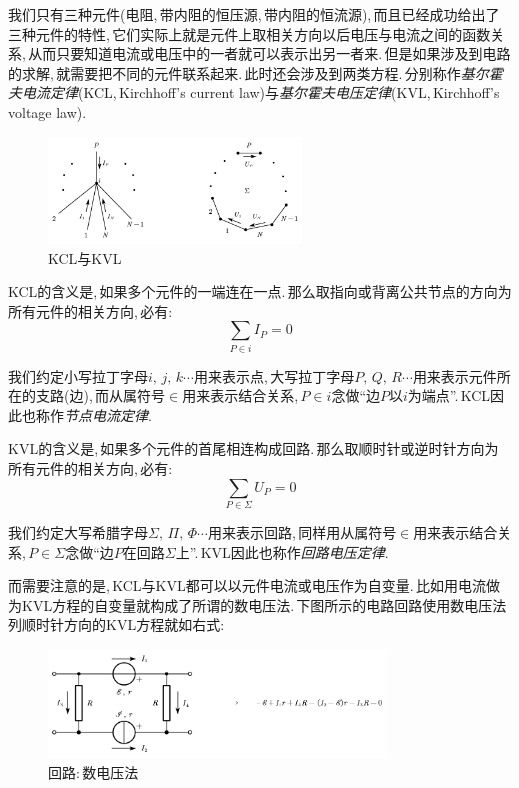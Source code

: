 \vspace{1cm}

我们只有三种元件(电阻,\,带内阻的恒压源,\,带内阻的恒流源),\,而且已经成功给出了三种元件的特性,\,它们实际上就是元件上取相关方向以后电压与电流之间的函数关系,\,从而只要知道电流或电压中的一者就可以表示出另一者来.\,但是如果涉及到电路的求解,\,就需要把不同的元件联系起来.\,此时还会涉及到两类方程.\,分别称作\emph{基尔霍夫电流定律}(KCL,\,Kirchhoff's current law)与\emph{基尔霍夫电压定律}(KVL,\,Kirchhoff's voltage law).

\begin{figure}[H]
\centering
\includegraphics[width=0.6\textwidth]{image/7-3-11.png}
\caption{KCL与KVL}
\end{figure}

KCL的含义是,\,如果多个元件的一端连在一点.\,那么取指向或背离公共节点的方向为所有元件的相关方向,\,必有:
\[\sum_{P\in i} I_P=0\]

我们约定小写拉丁字母$i,\,j,\,k\cdots$用来表示点,\,大写拉丁字母$P,\,Q,\,R\cdots$用来表示元件所在的支路(边),\,而从属符号$\in$用来表示结合关系,\,$P\in i$念做``边$P$以$i$为端点''.\,KCL因此也称作\emph{节点电流定律}.

KVL的含义是,\,如果多个元件的首尾相连构成回路.\,那么取顺时针或逆时针方向为所有元件的相关方向,\,必有:
\[\sum_{P\in \Sigma} U_P=0\]

我们约定大写希腊字母$\Sigma ,\,\Pi,\, \Phi\cdots$用来表示回路,\,同样用从属符号$\in$用来表示结合关系,\,$P\in \Sigma$念做``边$P$在回路$ \Sigma$上''.\,KVL因此也称作\emph{回路电压定律}.

而需要注意的是,\,KCL与KVL都可以以元件电流或电压作为自变量.\,比如用电流做为KVL方程的自变量就构成了所谓的数电压法.\,下图所示的电路回路使用数电压法列顺时针方向的KVL方程就如右式:

\begin{figure}[H]
\centering
\includegraphics[width=0.8\textwidth]{image/7-3-12.png}
\caption{回路:\,数电压法}
\end{figure}

